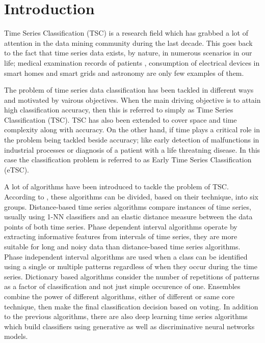 \chapter{Introduction}
\label{ChapterIntroduction}
Time Series Classification (TSC) is a research field which has grabbed a lot of attention in the data mining community during the last decade.
This goes back to the fact that time series data exists, by nature, in numerous scenarios in our life; medical examination records of patients \cite{griffin2001toward,ghalwash2012early}, consumption of electrical devices in smart homes and smart grids \cite{gao2014plaid,10.1145/2611286.2611333} and astronomy \cite{protopapas2006finding,rakthanmanon2013fast} are only few examples of them.

The problem of time series data classification has been tackled in different ways and motivated by vairous objectives.
When the main driving objective is to attain high classification accuracy, then this is referred to simply as Time Series Classification (TSC).
TSC has also been extended to cover space and time complexity along with accuracy.
On the other hand, if time plays a critical role in the problem being tackled beside accuracy; like early detection of malfunctions in industrial processes or diagnosis of a patient with a life threatning disease.
In this case the classification problem is referred to as Early Time Series Classification (eTSC).

A lot of algorithms have been introduced to tackle the problem of TSC.
According to \cite{bagnall2017great}, these algorithms can be divided, based on their technique, into six groups.
Distance-based time series algorithms compare instances of time series, usually using 1-NN classifiers and an elastic distance measure between the data points of both time series.
Phase dependent interval algorithms operate by extracting informative features from intervals of time series, they are more suitable for long and noisy data than distance-based time series algorithms.
Phase independent interval algorithms are used when a class can be identified using a single or multiple patterns regardless of when they occur during the time series.
Dictionary based algorithms consider the number of repetitions of patterns as a factor of classification and not just simple occurence of one.
Ensembles combine the power of different algorithms, either of different or same core technique, then make the final classification decision based on voting.
In addition to the previous algorithms, there are also deep learning time series algorithms which build classifiers using generative as well as discriminative neural networks models.

